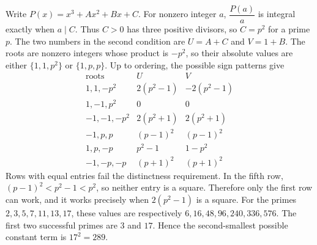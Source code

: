 Write $P(x)=x^3+Ax^2+Bx+C$. For nonzero integer $a$, $\dfrac{P(a)}{a}$ is integral exactly when $a\mid C$. Thus $C>0$ has three positive divisors, so $C=p^2$ for a prime $p$.
The two numbers in the second condition are $U=A+C$ and $V=1+B$. The roots are nonzero integers whose product is $-p^2$, so their absolute values are either $\{1,1,p^2\}$ or $\{1,p,p\}$. Up to ordering, the possible sign patterns give
\[
\begin{array}{c|c|c}
\text{roots}&U&V\\ \hline
1,1,-p^2&2(p^2-1)&-2(p^2-1)\\
1,-1,p^2&0&0\\
-1,-1,-p^2&2(p^2+1)&2(p^2+1)\\
-1,p,p&(p-1)^2&(p-1)^2\\
1,p,-p&p^2-1&1-p^2\\
-1,-p,-p&(p+1)^2&(p+1)^2
\end{array}
\]
Rows with equal entries fail the distinctness requirement. In the fifth row, $(p-1)^2<p^2-1<p^2$, so neither entry is a square. Therefore only the first row can work, and it works precisely when $2(p^2-1)$ is a square.
For the primes $2,3,5,7,11,13,17$, these values are respectively $6,16,48,96,240,336,576$. The first two successful primes are $3$ and $17$. Hence the second-smallest possible constant term is $\boxed{17^2=289}$.
